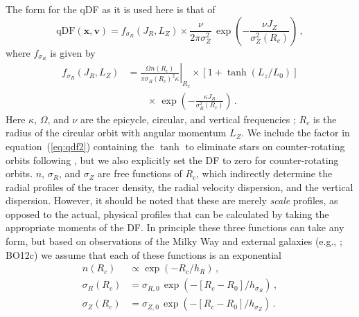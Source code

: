 \documentclass{emulateapj}
\newcommand{\eg}{e.g.}
\newcommand{\eqnname}{equation}
\renewcommand{\vec}[1]{\ensuremath{\mathbf{#1}}}
\newcommand{\vecx}{\ensuremath{\vec{x}}}
\newcommand{\vecv}{\ensuremath{\vec{v}}}
\newcommand{\jr}{\ensuremath{J_R}}
\newcommand{\jz}{\ensuremath{J_Z}}
\newcommand{\lz}{\ensuremath{L_Z}}
\newcommand{\bo}{BO12}
\begin{document}
The form for the qDF as it is used here is that of \citet{Binney11a}
\begin{equation}\label{eq:qdf}
  \mathrm{qDF}(\vecx,\vecv) = f_{\sigma_R}(\jr,\lz) \times \frac{\nu}{2\pi\sigma_Z^2}\,\exp\left(-\frac{\nu \jz}{\sigma_Z^2(R_c)}\right)\,,
\end{equation}
where $f_{\sigma_R}$ is given by
\begin{equation}\label{eq:qdf2}
\begin{split}
  f_{\sigma_R}(\jr,\lz) & = \left.\frac{\Omega n(R_c)}{\pi\sigma_R(R_c)^2
    \kappa}\right|_{R_c}\times\left[1+\tanh(L_z/L_0)\right]\\
  & \qquad \times\,\exp\left(-\frac{\kappa
    \jr}{\sigma_R^2(R_c)}\right)\,.
\end{split}
\end{equation}
Here $\kappa$, $\Omega$, and $\nu$ are the epicycle, circular, and
vertical frequencies \citep{binneytremaine}; $R_c$ is the radius of
the circular orbit with angular momentum $\lz$. We include the factor
in \eqnname~(\ref{eq:qdf2}) containing the $\tanh$ to eliminate stars
on counter-rotating orbits following \citet{Binney11a}, but we also
explicitly set the DF to zero for counter-rotating orbits. $n$,
$\sigma_R$, and $\sigma_Z$ are free functions of $R_c$, which
indirectly determine the radial profiles of the tracer density, the
radial velocity dispersion, and the vertical dispersion. However, it
should be noted that these are merely \emph{scale} profiles, as
opposed to the actual, physical profiles that can be calculated by
taking the appropriate moments of the DF. In principle these three
functions can take any form, but based on observations of the Milky
Way and external galaxies (\eg, \citealt{Lewis89a}; \bo c) we assume
that each of these functions is an exponential
\begin{align}\label{eq:inputprofile}
  n(R_c) & \propto \exp\left(-R_c/h_R\right)\,,\\
  \sigma_R(R_c) & = \sigma_{R,0}\,\exp\left(-\left[R_c-R_0\right]/h_{\sigma_R}\right)\,,\\
  \sigma_Z(R_c) & = \sigma_{Z,0}\,\exp\left(-\left[R_c-R_0\right]/h_{\sigma_Z}\right)\,.\label{eq:inputprofile2}
\end{align}
\end{document}
